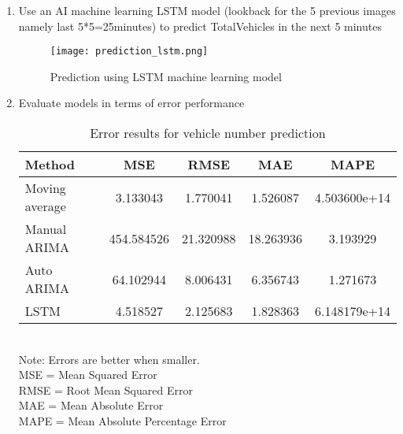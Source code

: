 \documentclass{intcov_report}
\begin{document}
\begin{enumerate}
\item Use an AI machine learning LSTM model (lookback for the 5 previous images namely last 5*5=25minutes) to predict TotalVehicles in the next 5 minutes

     \begin{figure}[H]
         \centering
         \texttt{[image: prediction\_lstm.png]}
         \label{fig:prediction_lstm}
         \caption{Prediction using LSTM machine learning model}
     \end{figure}
     
\item Evaluate models in terms of error performance

\begin{table}[H]
\caption{Error results for vehicle number prediction}

\begin{center}
\begin{tabular}{ l c c c c } 
 \hline
 Method & MSE & RMSE & MAE & MAPE \\
  \hline
Moving average & 3.133043 & 1.770041 & 1.526087 & 4.503600e+14\\
Manual ARIMA & 454.584526 & 21.320988 & 18.263936 & 3.193929\\
Auto ARIMA & 64.102944 & 8.006431 & 6.356743 & 1.271673\\
LSTM & 4.518527 & 2.125683 & 1.828363 & 6.148179e+14\\

 \hline
\end{tabular}
 \\Note: Errors are better when smaller.\\
 MSE = Mean Squared Error \\
 RMSE = Root Mean Squared Error\\
 MAE = Mean Absolute Error\\
 MAPE = Mean Absolute Percentage Error
\end{center}
\label{tab:vehicle_pred_results}

\end{table}


\end{enumerate}
\end{document}
